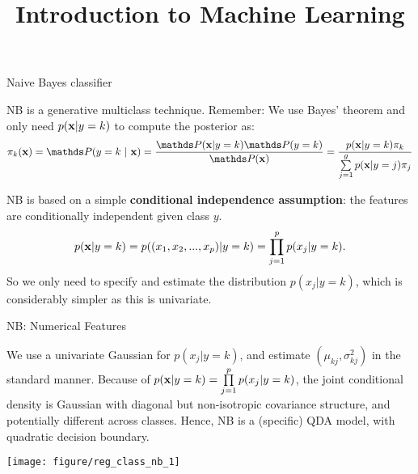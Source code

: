 \documentclass[11pt,compress,t,notes=noshow, xcolor=table]{beamer}
\title{Introduction to Machine Learning}
\begin{document}

\framebreak

\begin{vbframe}{Naive Bayes classifier}

NB is a generative multiclass technique. Remember: We use Bayes' theorem and only need $p(\mathbf{x} | y= k)$ to compute the posterior as:
$$\pikx = \postk = \frac{\P(\xv | y = k) \P(y = k)}{\P(\xv)} = \frac{\pdfxyk \pik}{\sumjg \pdfxyk[j] \pi_j} $$


NB is based on a simple \textbf{conditional independence assumption}: the features are conditionally independent given class $y$.
$$
p(\mathbf{x} | y= k) = p((x_1, x_2, ..., x_p)|y = k)=\prod\limits_{j=1}^p p(x_j|y = k).
$$
So we only need to specify and estimate the distribution $p(x_j|y = k)$, which is considerably simpler as this is univariate.

\end{vbframe}


\begin{vbframe}{NB: Numerical Features}

We use a univariate Gaussian for $p(x_j | y=k)$, and estimate $(\mu_{kj}, \sigma^2_{kj})$ in the standard manner. Because of $p(\mathbf{x} | y= k) = \prod\limits_{j=1}^p p(x_j|y = k)$, the joint conditional density is Gaussian with diagonal but non-isotropic covariance structure, and potentially different across classes. Hence, NB is a (specific) QDA model, with quadratic decision boundary.

\begin{knitrout}\scriptsize
{}\color{fgcolor}

{\centering \texttt{[image: figure/reg\_class\_nb\_1]} 

}



\end{knitrout}
\end{vbframe}
\end{document}
